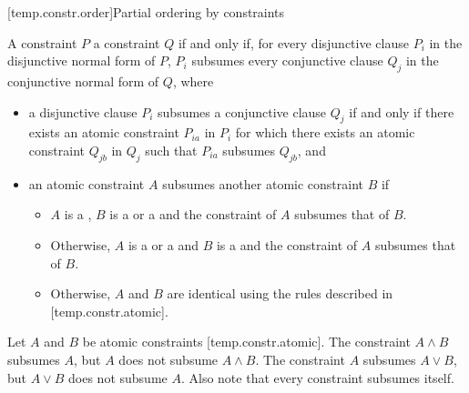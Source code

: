 \documentclass{wg21}
\begin{document}
[temp.constr.order]{Partial ordering by constraints}


\pnum
A constraint $P$  a constraint $Q$
if and only if,
for every disjunctive clause $P_i$
in the disjunctive normal form
of $P$, $P_i$ subsumes every conjunctive clause $Q_j$
in the conjunctive normal form of $Q$, where
\begin{itemize}
    \item
    a disjunctive clause $P_i$ subsumes a conjunctive clause $Q_j$ if and only
    if there exists an atomic constraint $P_{ia}$ in $P_i$ for which there exists
    an atomic constraint $Q_{jb}$ in $Q_j$ such that $P_{ia}$ subsumes $Q_{jb}$, and

    \item an atomic constraint $A$ subsumes another atomic constraint
    $B$ if 
    \begin{addedblock}
        \begin{itemize}
        \item $A$ is a ,
        $B$ is a  or a 
        and the constraint of $A$ subsumes that of $B$.

        \item Otherwise, $A$ is a  or a  
        and $B$ is a 
        and the constraint of $A$ subsumes that of $B$.

        \item Otherwise, $A$ and $B$ are identical using the rules described in [temp.constr.atomic].
        \end{itemize}
    \end{addedblock}
\end{itemize}
%
\begin{example}
    Let $A$ and $B$ be atomic constraints [temp.constr.atomic].
    The constraint $A \land B$ subsumes $A$, but $A$ does not subsume $A \land B$.
    The constraint $A$ subsumes $A \lor B$, but $A \lor B$ does not subsume $A$.
    Also note that every constraint subsumes itself.
\end{example}
\end{document}
